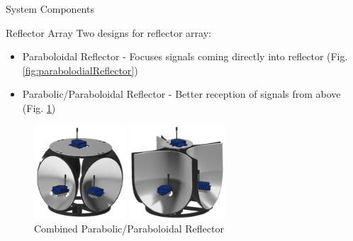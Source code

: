 \documentclass{beamer}
\begin{document}
\begin{frame}{System Components}
    \begin{block}{Reflector Array}
    Two designs for reflector array:
    \begin{itemize}
      \item Paraboloidal Reflector - Focuses signals coming directly into reflector (Fig. \ref{fig:parabolodialReflector})
      \item Parabolic/Paraboloidal Reflector - Better reception of signals from above (Fig. \ref{fig:parabolicReflector})
    \end{itemize}
    \end{block}
    \begin{figure}
      \centering
      \begin{minipage}[t]{0.5\textwidth}
        \centering
        \includegraphics[height=3.5cm]{figs/img/paraboloidalReflector}
        \caption{Paraboloidal Reflector Model}
        \label{fig:parabolodialReflector}
      \end{minipage}
      \begin{minipage}[t]{0.4\textwidth}
        \centering
        \includegraphics[height=3.5cm]{figs/img/parabolicReflector}
        \caption{Combined Parabolic/Paraboloidal Reflector}
        \label{fig:parabolicReflector}
      \end{minipage}
    \end{figure}
\end{frame}


\setlength{\dashlinedash}{2pt}
\setlength{\dashlinegap}{4pt}
\setlength{\arrayrulewidth}{0.3pt}
\end{document}
